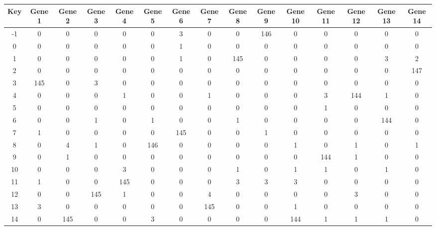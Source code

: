 \begin{tabular}{|c|c|c|c|c|c|c|c|c|c|c|c|c|c|c|}
\hline
Key & Gene 1 & Gene 2 & Gene 3 & Gene 4 & Gene 5 & Gene 6 & Gene 7 & Gene 8 & Gene 9 & Gene 10 & Gene 11 & Gene 12 & Gene 13 & Gene 14 \\
\hline
-1 & 0 & 0 & 0 & 0 & 0 & 3 & 0 & 0 & 146 & 0 & 0 & 0 & 0 & 0 \\
0 & 0 & 0 & 0 & 0 & 0 & 1 & 0 & 0 & 0 & 0 & 0 & 0 & 0 & 0 \\
1 & 0 & 0 & 0 & 0 & 0 & 1 & 0 & 145 & 0 & 0 & 0 & 0 & 3 & 2 \\
2 & 0 & 0 & 0 & 0 & 0 & 0 & 0 & 0 & 0 & 0 & 0 & 0 & 0 & 147 \\
3 & 145 & 0 & 3 & 0 & 0 & 0 & 0 & 0 & 0 & 0 & 0 & 0 & 0 & 0 \\
4 & 0 & 0 & 0 & 1 & 0 & 0 & 1 & 0 & 0 & 0 & 3 & 144 & 1 & 0 \\
5 & 0 & 0 & 0 & 0 & 0 & 0 & 0 & 0 & 0 & 0 & 1 & 0 & 0 & 0 \\
6 & 0 & 0 & 1 & 0 & 1 & 0 & 0 & 1 & 0 & 0 & 0 & 0 & 144 & 0 \\
7 & 1 & 0 & 0 & 0 & 0 & 145 & 0 & 0 & 1 & 0 & 0 & 0 & 0 & 0 \\
8 & 0 & 4 & 1 & 0 & 146 & 0 & 0 & 0 & 0 & 1 & 0 & 1 & 0 & 1 \\
9 & 0 & 1 & 0 & 0 & 0 & 0 & 0 & 0 & 0 & 0 & 144 & 1 & 0 & 0 \\
10 & 0 & 0 & 0 & 3 & 0 & 0 & 0 & 1 & 0 & 1 & 1 & 0 & 1 & 0 \\
11 & 1 & 0 & 0 & 145 & 0 & 0 & 0 & 3 & 3 & 3 & 0 & 0 & 0 & 0 \\
12 & 0 & 0 & 145 & 1 & 0 & 0 & 4 & 0 & 0 & 0 & 0 & 3 & 0 & 0 \\
13 & 3 & 0 & 0 & 0 & 0 & 0 & 145 & 0 & 0 & 1 & 0 & 0 & 0 & 0 \\
14 & 0 & 145 & 0 & 0 & 3 & 0 & 0 & 0 & 0 & 144 & 1 & 1 & 1 & 0 \\
\hline
\end{tabular}